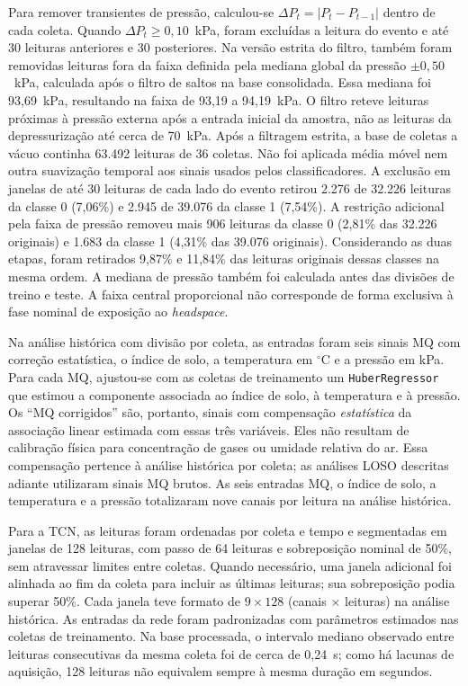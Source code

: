 Para remover transientes de pressão, calculou-se
$\Delta P_t=|P_t-P_{t-1}|$ dentro de cada coleta. Quando
$\Delta P_t\geq 0{,}10$~kPa, foram excluídas a leitura do evento e até
30 leituras anteriores e 30 posteriores. Na versão estrita do filtro,
também foram removidas leituras fora da faixa definida pela mediana global
da pressão $\pm 0{,}50$~kPa, calculada após o filtro de saltos na base
consolidada. Essa mediana foi 93,69~kPa, resultando na faixa de
93,19 a 94,19~kPa. O filtro reteve leituras próximas à
pressão externa após a entrada inicial da amostra, não as leituras da
depressurização até cerca de 70~kPa. Após a
filtragem estrita, a base de coletas a vácuo continha 63.492 leituras de
36 coletas. Não foi aplicada média móvel nem outra suavização temporal
aos sinais usados pelos classificadores.
A exclusão em janelas de até 30 leituras de cada lado do evento retirou
2.276 de 32.226 leituras da classe 0 (7,06\%) e 2.945 de 39.076 da
classe 1 (7,54\%). A restrição adicional pela faixa de pressão removeu
mais 906 leituras da classe 0 (2,81\% das 32.226 originais) e 1.683 da
classe 1 (4,31\% das 39.076 originais). Considerando as duas
etapas, foram retirados 9,87\% e 11,84\% das leituras originais dessas
classes na mesma ordem.
A mediana de pressão também foi calculada antes das divisões de treino e
teste. A faixa central proporcional não corresponde de forma exclusiva
à fase nominal de exposição ao \textit{headspace}.

Na análise histórica com divisão por coleta, as entradas foram seis
sinais MQ com correção estatística, o índice de solo, a temperatura em $^{\circ}$C e a
pressão em kPa. Para cada MQ, ajustou-se com as coletas de
treinamento um \texttt{HuberRegressor} que estimou a componente associada
ao índice de solo, à temperatura e à pressão.
Os
``MQ corrigidos'' são, portanto, sinais com compensação \emph{estatística}
da associação linear estimada com essas três variáveis. Eles não resultam
de calibração física para concentração de gases ou umidade relativa do ar.
Essa compensação pertence à análise histórica por coleta; as análises LOSO
descritas adiante utilizaram sinais MQ brutos. As seis entradas MQ, o
índice de solo, a temperatura e a pressão totalizaram nove canais por
leitura na análise histórica.

Para a TCN, as leituras foram ordenadas por coleta e tempo e segmentadas
em janelas de 128 leituras, com passo de 64 leituras e sobreposição nominal
de 50\%, sem atravessar limites entre coletas. Quando necessário, uma
janela adicional foi alinhada ao fim da coleta para incluir as últimas
leituras; sua sobreposição podia superar 50\%. Cada janela teve formato de
$9\times128$ (canais $\times$ leituras) na análise histórica. As entradas
da rede foram padronizadas com parâmetros estimados nas coletas de
treinamento. Na base processada, o intervalo mediano observado entre
leituras consecutivas da mesma coleta foi de cerca de 0,24~s;
como há lacunas de aquisição, 128 leituras não equivalem sempre à mesma
duração em segundos.



